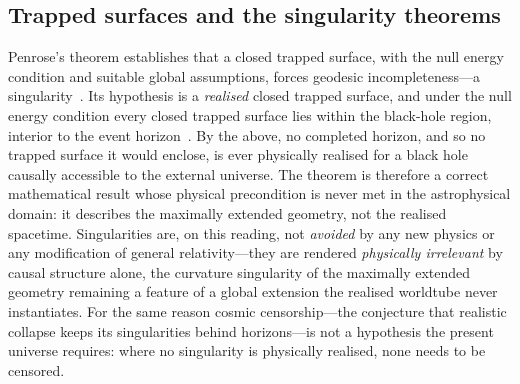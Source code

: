 \documentclass[11pt,a4paper]{article}
\theoremstyle{plain}
\theoremstyle{remark}
\begin{document}
\subsection*{Trapped surfaces and the singularity theorems}
Penrose's theorem establishes that a closed trapped surface, with the null energy condition and suitable global assumptions, forces geodesic incompleteness---a singularity~\cite{Penrose1965}. Its hypothesis is a \emph{realised} closed trapped surface, and under the null energy condition every closed trapped surface lies within the black-hole region, interior to the event horizon~\cite{Hawking1973,Wald1984}. By the above, no completed horizon, and so no trapped surface it would enclose, is ever physically realised for a black hole causally accessible to the external universe. The theorem is therefore a correct mathematical result whose physical precondition is never met in the astrophysical domain: it describes the maximally extended geometry, not the realised spacetime. Singularities are, on this reading, not \emph{avoided} by any new physics or any modification of general relativity---they are rendered \emph{physically irrelevant} by causal structure alone, the curvature singularity of the maximally extended geometry remaining a feature of a global extension the realised worldtube never instantiates. For the same reason cosmic censorship---the conjecture that realistic collapse keeps its singularities behind horizons---is not a hypothesis the present universe requires: where no singularity is physically realised, none needs to be censored.
\end{document}
